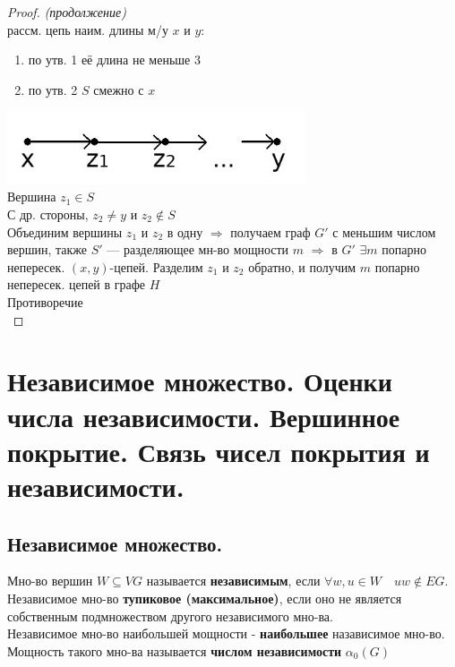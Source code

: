 \documentclass[12pt]{article}
\begin{document}
\begin{proof}\textit{(продолжение)}\\
	рассм. цепь наим. длины м/у $x$ и $y$:\\
	\begin{enumerate}
		\item по утв. 1 её длина не меньше 3
		\item по утв. 2 $S$ смежно с $x$
	\end{enumerate}
	\includegraphics[width=250pt]{65}\\
	Вершина $z_1 \in S$\\
	С др. стороны, $z_2 \neq y$ и $z_2 \notin S$\\
	Объединим вершины $z_1$  и $z_2$ в одну $\Rightarrow$ получаем граф $G'$ с меньшим числом вершин, также $S'$ — разделяющее мн-во мощности $m$ $\Rightarrow$ в $G'$ $\exists m$ попарно непересек. $(x,y)$-цепей. Разделим $z_1$ и $z_2$ обратно, и получим $m$ попарно непересек. цепей в графе $H$\\
	Противоречие\\
	\qedsymbol
\end{proof}	

\section{Независимое множество. Оценки числа независимости. Вершинное покрытие. Связь чисел покрытия и независимости.}
\subsection{Независимое множество.}
	Мно-во вершин $W\subseteq VG$ называется \textbf{независимым}, если $\forall w, u \in W \quad uw\not\in EG$.\\
		Независимое мно-во \textbf{тупиковое (максимальное)}, если оно не является собственным подмножеством другого независимого мно-ва.\\
	Независимое мно-во наибольшей мощности - \textbf{наибольшее} назависимое мно-во. Мощность такого мно-ва называется \textbf{числом независимости} $\alpha_0(G)$
\end{document}

